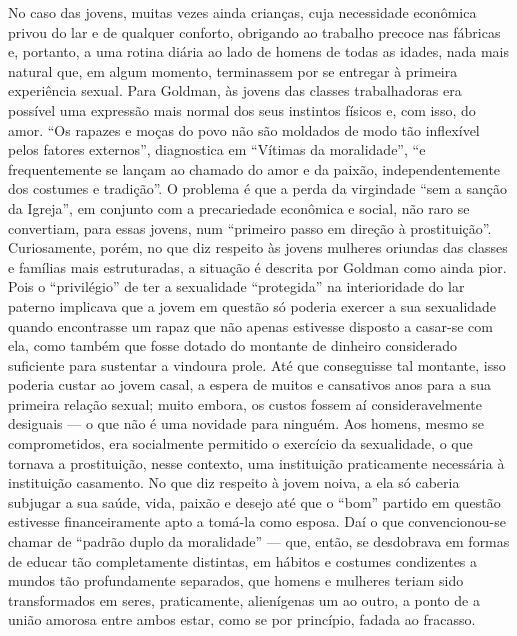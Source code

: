 No caso das jovens, muitas vezes ainda crianças, cuja necessidade
econômica privou do lar e de qualquer conforto, obrigando ao trabalho
precoce nas fábricas e, portanto, a uma rotina diária ao lado de homens
de todas as idades, nada mais natural que, em algum momento, terminassem
por se entregar à primeira experiência sexual. Para Goldman, às jovens
das classes trabalhadoras era possível uma expressão mais normal dos
seus instintos físicos e, com isso, do amor. ``Os rapazes e moças do
povo não são moldados de modo tão inflexível pelos fatores externos'',
diagnostica em ``Vítimas da moralidade'', ``e frequentemente se lançam
ao chamado do amor e da paixão, independentemente dos costumes e
tradição''. O problema é que a perda da virgindade ``sem a sanção da
Igreja'', em conjunto com a precariedade econômica e social, não raro se
convertiam, para essas jovens, num ``primeiro passo em direção à
prostituição''. Curiosamente, porém, no que diz respeito às jovens
mulheres oriundas das classes e famílias mais estruturadas, a situação é
descrita por Goldman como ainda pior. Pois o ``privilégio'' de ter a
sexualidade ``protegida'' na interioridade do lar paterno implicava que
a jovem em questão só poderia exercer a sua sexualidade quando
encontrasse um rapaz que não apenas estivesse disposto a casar-se com
ela, como também que fosse dotado do montante de dinheiro considerado
suficiente para sustentar a vindoura prole. Até que conseguisse tal
montante, isso poderia custar ao jovem casal, a espera de muitos e
cansativos anos para a sua primeira relação sexual; muito embora, os
custos fossem aí consideravelmente desiguais --- o que não é uma novidade
para ninguém. Aos homens, mesmo se comprometidos, era socialmente
permitido o exercício da sexualidade, o que tornava a prostituição,
nesse contexto, uma instituição praticamente necessária à instituição
casamento. No que diz respeito à jovem noiva, a ela só caberia subjugar
a sua saúde, vida, paixão e desejo até que o ``bom'' partido em questão
estivesse financeiramente apto a tomá-la como esposa. Daí o que
convencionou-se chamar de ``padrão duplo da moralidade'' --- que, então,
se desdobrava em formas de educar tão completamente distintas, em
hábitos e costumes condizentes a mundos tão profundamente separados, que
homens e mulheres teriam sido transformados em seres, praticamente,
alienígenas um ao outro, a ponto de a união amorosa entre ambos estar,
como se por princípio, fadada ao fracasso.

